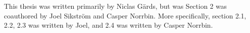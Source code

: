 
This thesis was written primarily by Niclas Gärds, but was Section 2 was coauthored by Joel Sikström and Casper Norrbin. More specifically, section 2.1, 2.2, 2.3 was written by Joel, and 2.4 was written by Casper Norrbin.

